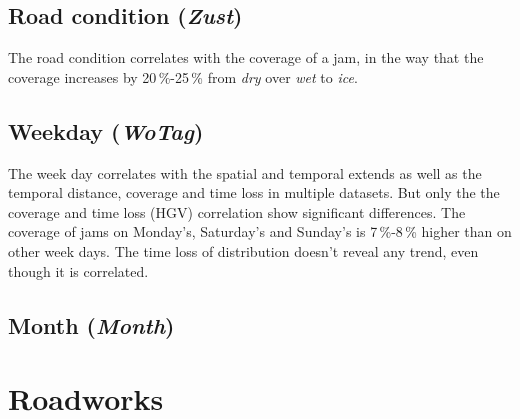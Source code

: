 \subsection{Road condition (\textit{Zust})}
The road condition correlates with the coverage of a jam, in the way that the coverage increases by 20\,\%-25\,\% from \textit{dry} over \textit{wet} to \textit{ice}.

\subsection{Weekday (\textit{WoTag})}
The week day correlates with the spatial and temporal extends as well as the temporal distance, coverage and time loss in multiple datasets. But only the the coverage and time loss (HGV) correlation show significant differences. The coverage of jams on Monday's, Saturday's and Sunday's is 7\,\%-8\,\% higher than on other week days. The time loss of distribution doesn't reveal any trend, even though it is correlated.

\subsection{Month (\textit{Month})}



\section{Roadworks}


